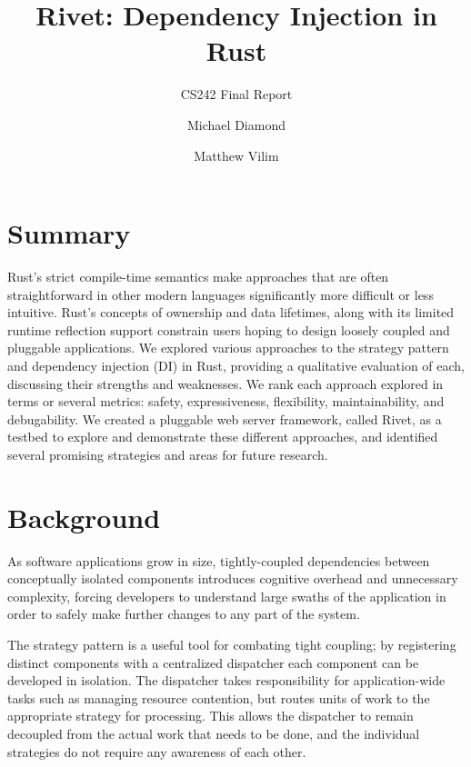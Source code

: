 \documentclass[sigconf]{acmart}
\begin{document}
\title{Rivet: Dependency Injection in Rust}
\subtitle{CS242 Final Report}

\author{Michael Diamond}
\affiliation{}

\author{Matthew Vilim}
\affiliation{}

\maketitle

\section{Summary}

Rust's strict compile-time semantics make approaches that are often straightforward in other modern languages significantly more difficult or less intuitive. Rust's concepts of ownership and data lifetimes, along with its limited runtime reflection support constrain users hoping to design loosely coupled and pluggable applications. We explored various approaches to the strategy pattern\cite{wiki:strategy-pattern} and dependency injection\cite{wiki:di} (DI) in Rust, providing a qualitative evaluation of each, discussing their strengths and weaknesses. We rank each approach explored in terms or several metrics: safety, expressiveness, flexibility, maintainability, and debugability. We created a pluggable web server framework, called Rivet, as a testbed to explore and demonstrate these different approaches, and identified several promising strategies and areas for future research.

\section{Background}

As software applications grow in size, tightly-coupled dependencies between conceptually isolated components introduces cognitive overhead and unnecessary complexity, forcing developers to understand large swaths of the application in order to safely make further changes to any part of the system.

The strategy pattern is a useful tool for combating tight coupling; by registering distinct components with a centralized dispatcher each component can be developed in isolation. The dispatcher takes responsibility for application-wide tasks such as managing resource contention, but routes units of work to the appropriate strategy for processing. This allows the dispatcher to remain decoupled from the actual work that needs to be done, and the individual strategies do not require any awareness of each other.
\end{document}
